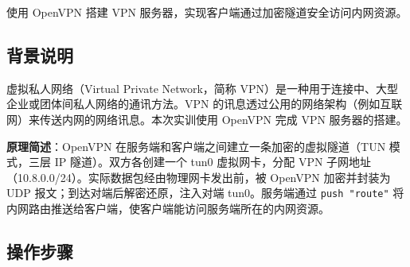 \documentclass[12pt,a4paper]{ctexart}
\begin{document}
使用 OpenVPN 搭建 VPN 服务器，实现客户端通过加密隧道安全访问内网资源。

\subsection{背景说明}

虚拟私人网络（Virtual Private Network，简称 VPN）是一种用于连接中、大型企业或团体间私人网络的通讯方法。VPN 的讯息透过公用的网络架构（例如互联网）来传送内网的网络讯息。本次实训使用 OpenVPN 完成 VPN 服务器的搭建。

\textbf{原理简述}：OpenVPN 在服务端和客户端之间建立一条加密的虚拟隧道（TUN 模式，三层 IP 隧道）。双方各创建一个 tun0 虚拟网卡，分配 VPN 子网地址（10.8.0.0/24）。实际数据包经由物理网卡发出前，被 OpenVPN 加密并封装为 UDP 报文；到达对端后解密还原，注入对端 tun0。服务端通过 \texttt{push "route"} 将内网路由推送给客户端，使客户端能访问服务端所在的内网资源。

\subsection{操作步骤}
\end{document}
